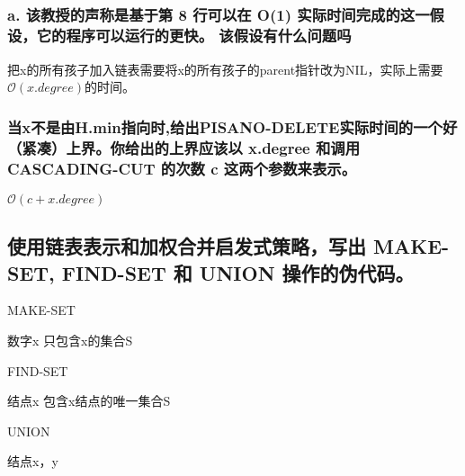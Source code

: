 \documentclass[UTF8]{ctexart}
\begin{document}
\subsection{}
\subsubsection{a. 该教授的声称是基于第 8 行可以在 O(1) 实际时间完成的这一假设，它的程序可以运行的更快。
该假设有什么问题吗}
把x的所有孩子加入链表需要将x的所有孩子的parent指针改为NIL，实际上需要$\mathcal{O}(x.degree)$的时间。
\subsubsection{当x不是由H.min指向时,给出PISANO-DELETE实际时间的一个好（紧凑）上界。你给出的上界应该以 x.degree 和调用 CASCADING-CUT 的次数 c 这两个参数来表示。}
$\mathcal{O}(c+x.degree)$

\subsection{使用链表表示和加权合并启发式策略，写出 MAKE-SET, FIND-SET 和 UNION 操作的伪代码。}

\begin{algorithm}
	\caption{MAKE-SET}
	\begin{algorithmic}[1]%
	\Require 数字x
	\Ensure 只包含x的集合S
	\\
	\end{algorithmic}
\end{algorithm}

\begin{algorithm}
	\caption{FIND-SET}
	\begin{algorithmic}[1]%
	\Require 结点x
	\Ensure 包含x结点的唯一集合S\\
	\end{algorithmic}
\end{algorithm}

\begin{algorithm}
	\caption{UNION}
	\begin{algorithmic}[1]%
	\Require 结点x，y
		\EndFor
	\Else
		\EndFor
	\EndIf
	\end{algorithmic}
\end{algorithm}
\end{document}
